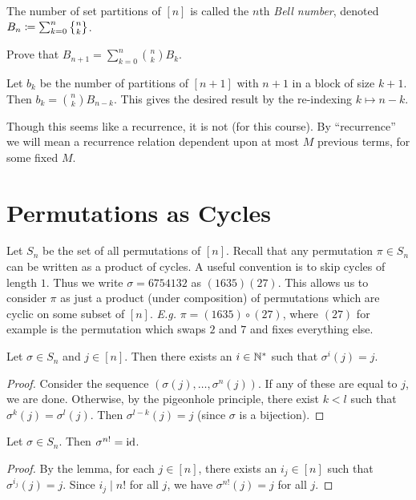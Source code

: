 \begin{definition} \label{def:bell}
    The number of set partitions of $[n]$ is called the $n$th \emph{Bell
    number}, denoted $B_n \coloneq \sum_{k=0}^{n} \stirling nk$.
\end{definition}

\begin{exercise}
    Prove that $B_{n+1} = \sum_{k=0}^{n} \binom{n}{k} B_k$.
\end{exercise}
\begin{solution}
    Let $b_k$ be the number of partitions of $[n+1]$ with $n+1$ in a block
    of size $k+1$.
    Then $b_k = \binom{n}{k} B_{n-k}$.
    This gives the desired result by the re-indexing $k \mapsto n-k$.
\end{solution}
Though this seems like a recurrence, it is not (for this course).
By ``recurrence'' we will mean a recurrence relation dependent upon at most
$M$ previous terms, for some fixed $M$.

\section{Permutations as Cycles} \label{sec:perm:cycles}
Let $S_n$ be the set of all permutations of $[n]$.
Recall that any permutation $\pi \in S_n$ can be written as a product of
cycles.
A useful convention is to skip cycles of length $1$.
Thus we write $\sigma = 6754132$ as $(1635)(27)$.
This allows us to consider $\pi$ as just a product (under composition) of
permutations which are cyclic on some subset of $[n]$.
\textit{E.g.} $\pi = (1635) \circ (27)$, where $(27)$ for example is the
permutation which swaps $2$ and $7$ and fixes everything else.

\begin{lemma}
    Let $\sigma \in S_n$ and $j \in [n]$.
    Then there exists an $i \in \mathbb{N}^*$ such that $\sigma^i(j) = j$.
\end{lemma}
\begin{proof}
    Consider the sequence $(\sigma(j), \dots, \sigma^n(j))$.
    If any of these are equal to $j$, we are done.
    Otherwise, by the pigeonhole principle, there exist $k < l$ such that
    $\sigma^k(j) = \sigma^l(j)$.
    Then $\sigma^{l-k}(j) = j$ (since $\sigma$ is a bijection).
\end{proof}
\begin{corollary}
    Let $\sigma \in S_n$.
    Then $\sigma^{n!} = \mathrm{id}$.
\end{corollary}
\begin{proof}
    By the lemma, for each $j \in [n]$, there exists an $i_j \in [n]$ such
    that $\sigma^{i_j}(j) = j$.
    Since $i_j \mid n!$ for all $j$, we have $\sigma^{n!}(j) = j$ for all
    $j$.
\end{proof}

